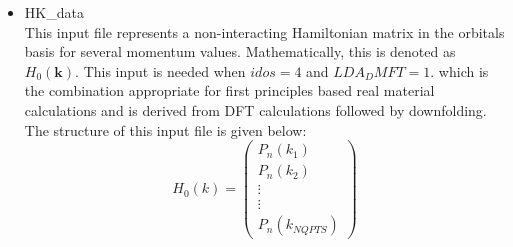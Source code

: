 \documentclass[a4paper]{article}
\begin{document}
\begin{itemize}
\item{HK\_data}\\

This input file represents a non-interacting Hamiltonian matrix in the orbitals
basis for several momentum values. Mathematically, this is denoted as $H_0({\mathbf{k}})$. This input is needed when $idos=4$ and $LDA_DMFT=1$.
which is the combination appropriate for first principles based real material calculations and
is derived from DFT calculations followed by downfolding. The structure of this input file is given below:
\begin{equation}
H_{0}(k) =
\begin{pmatrix}
P_n(k_1) \\
P_n(k_2) \\
\vdots \\
\vdots \\
P_n(k_{NQPTS})
\end{pmatrix}
\end{equation}


\end{itemize}
\end{document}
